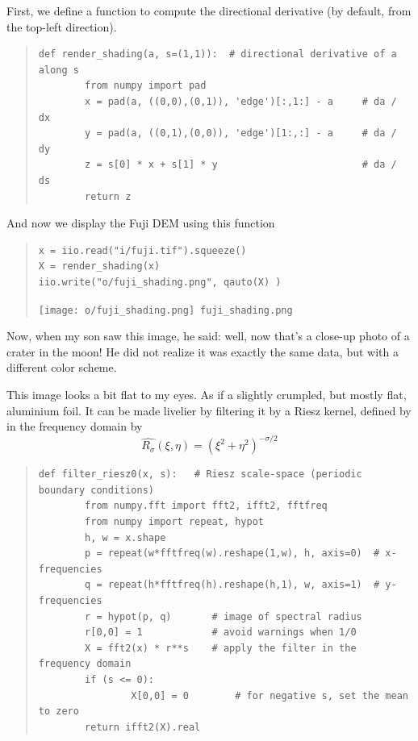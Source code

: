 First, we define a function to compute the directional derivative (by
default, from the top-left direction).

\begin{quote}
\begin{verbatim}
def render_shading(a, s=(1,1)):  # directional derivative of a along s
        from numpy import pad
        x = pad(a, ((0,0),(0,1)), 'edge')[:,1:] - a     # da / dx
        y = pad(a, ((0,1),(0,0)), 'edge')[1:,:] - a     # da / dy
        z = s[0] * x + s[1] * y                         # da / ds
        return z
\end{verbatim}
\end{quote}


And now we display the Fuji DEM using this function


\begin{quote}
\begin{verbatim}
x = iio.read("i/fuji.tif").squeeze()
X = render_shading(x)
iio.write("o/fuji_shading.png", qauto(X) )
\end{verbatim}
\texttt{[image: o/fuji\_shading.png]}~\verb+fuji_shading.png+
\end{quote}

Now, when my son saw this image, he said: well, now that's a close-up photo of a
crater in the moon!  He did not realize it was exactly the same data, but
with a different color scheme.

This image looks a bit flat to my eyes.
As if a slightly crumpled, but mostly flat, aluminium foil.
It can be made livelier by filtering it by a Riesz kernel, defined by
in the frequency domain by
\[
	\widehat{R_\sigma}(\xi,\eta)
	=
	\left(\xi^2+\eta^2\right)^{-\sigma/2}
\]

\begin{quote}
\begin{verbatim}
def filter_riesz0(x, s):   # Riesz scale-space (periodic boundary conditions)
        from numpy.fft import fft2, ifft2, fftfreq
        from numpy import repeat, hypot
        h, w = x.shape
        p = repeat(w*fftfreq(w).reshape(1,w), h, axis=0)  # x-frequencies
        q = repeat(h*fftfreq(h).reshape(h,1), w, axis=1)  # y-frequencies
        r = hypot(p, q)       # image of spectral radius
        r[0,0] = 1            # avoid warnings when 1/0
        X = fft2(x) * r**s    # apply the filter in the frequency domain
        if (s <= 0):
                X[0,0] = 0        # for negative s, set the mean to zero
        return ifft2(X).real
\end{verbatim}
\end{quote}

